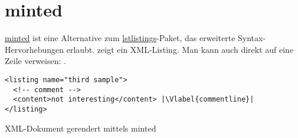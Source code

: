 \section{minted}

\href{https://github.com/gpoore/minted}{minted} ist eine Alternative zum \href{https://ctan.org/pkg/listings}{lstlistings}-Paket, das erweiterte Syntax-Hervorhebungen erlaubt.
 zeigt ein XML-Listing.
Man kann auch direkt auf eine Zeile verweisen: .

\begin{Listing}[hb]
  \begin{verbatim}
<listing name="third sample">
  <!-- comment -->
  <content>not interesting</content> |\Vlabel{commentline}|
</listing>
\end{verbatim}
  \caption{XML-Dokument gerendert mittels minted}
  \label{lst:xml}
\end{Listing}
